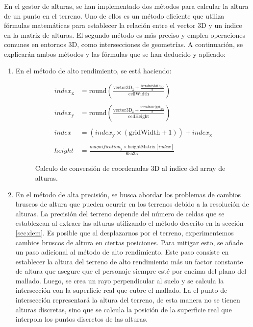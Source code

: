 \documentclass[a4paper, 11pt]{book}
\begin{document}
En el gestor de alturas, se han implementado dos métodos para calcular la altura de un punto en el terreno. Uno de ellos es un método eficiente que utiliza fórmulas matemáticas para establecer la relación entre el vector 3D y un índice en la matriz de alturas. El segundo método es más preciso y emplea operaciones comunes en entornos 3D, como intersecciones de geometrías.
A continuación, se explicarán ambos métodos y las fórmulas que se han deducido y aplicado:
\begin{enumerate}
    \item En el método de alto rendimiento, se está haciendo:
    \begin{figure}[H]
        \begin{align*}
        index_{\text{x}} &=\mathbf{\mathrm{round}}\left(\frac{\mathbf{\mathrm{vector3D}}_{\text{x}} + \frac{\mathbf{\mathrm{terrainWidth}}_{\text{3D}}}{2}}{\mathbf{\mathrm{cellWidth}}}\right) \\\\
        index_{\text{y}} &=\mathbf{\mathrm{round}}\left(\frac{\mathbf{\mathrm{vector3D}}_{\text{z}} + \frac{\mathbf{\mathrm{terrainHeight}}_{\text{3D}}}{2}}{\mathbf{\mathrm{cellHeight}}}\right) \\\\
        index_{} &=(index_{\text{y}} \times (\mathbf{\mathrm{gridWidth}} + 1 )) + index_{\text{x}} \\\\
        height{} &=\frac{magnification_{\text{y}} \times \mathbf{\mathrm{heightMatrix}}[index_{}]}{65535}
        \end{align*}
    \caption{Calculo de conversión de coordenadas 3D al índice del array de alturas.}
    \label{formula:calculoIndiceAlturas}
    \end{figure}
    \item En el método de alta precisión, se busca abordar los problemas de cambios bruscos de altura que pueden ocurrir en los terrenos debido a la resolución de alturas.
    La precisión del terreno depende del número de celdas que se establezcan al extraer las alturas utilizando el método descrito en la sección \ref{sec:dem}.
    Es posible que al desplazarnos por el terreno, experimentemos cambios bruscos de altura en ciertas posiciones. Para mitigar esto, se añade un paso adicional al método de alto rendimiento.
    Este paso consiste en establecer la altura del terreno de alto rendimiento más un factor constante de altura que asegure que el personaje siempre esté por encima del plano del mallado. Luego, se crea un rayo perpendicular al suelo y se calcula la intersección con la superficie real que cubre el mallado. 
    La el punto de intersección representará la altura del terreno, de esta manera no se tienen alturas discretas, sino que se calcula la posición de la superficie real que interpola los puntos discretos de las alturas.
\end{enumerate}
\end{document}
